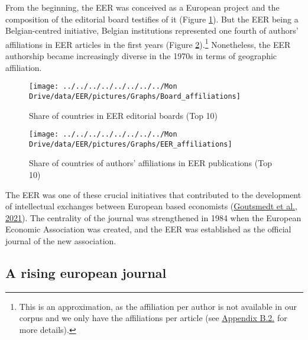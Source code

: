 \documentclass[
]{article}
\begin{document}
From the beginning, the EER was conceived as a European project and the
composition of the editorial board testifies of it (Figure
\ref{fig:plot-boards}). But the EER being a Belgian-centred initiative,
Belgian institutions represented one fourth of authors' affiliations in
EER articles in the first years (Figure
\ref{fig:plot-authors}).\footnote{This is an approximation, as the
  affiliation per author is not available in our corpus and we only have
  the affiliations per article (see
  \protect\hyperlink{author-affiliation}{Appendix B.2.} for more
  details).} Nonetheless, the EER authorship became increasingly diverse
in the 1970s in terms of geographic affiliation.

\begin{figure}[h]

{\centering \texttt{[image: ../../../../../../../../Mon Drive/data/EER/pictures/Graphs/Board\_affiliations]} 

}

\caption{Share of countries in EER editorial boards (Top 10)}\label{fig:plot-boards}
\end{figure}

\begin{figure}[h]

{\centering \texttt{[image: ../../../../../../../../Mon Drive/data/EER/pictures/Graphs/EER\_affiliations]} 

}

\caption{Share of countries of authors' affiliations in EER publications (Top 10)}\label{fig:plot-authors}
\end{figure}

The EER was one of these crucial initiatives that contributed to the
development of intellectual exchanges between European based economists
(\protect\hyperlink{ref-goutsmedt2021}{Goutsmedt et al., 2021}). The
centrality of the journal was strengthened in 1984 when the European
Economic Association was created, and the EER was established as the
official journal of the new association.

\hypertarget{rising-journal}{%
\subsection{A rising european journal}\label{rising-journal}}
\end{document}
